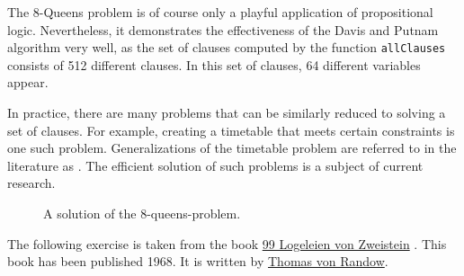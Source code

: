 The 8-Queens problem is of course only a playful application of propositional logic.
Nevertheless, it demonstrates the effectiveness of the Davis and Putnam algorithm very well, as the set of clauses computed by the function \texttt{allClauses}
consists of 512 different clauses. In this set of clauses, 64 different
variables appear.

In practice, there are many problems that can be similarly reduced to solving a
set of clauses. For example, creating a timetable that meets certain constraints is one such problem. Generalizations of the
timetable problem are referred to in the literature as .
The efficient solution of such problems is a subject of current research.

\begin{figure}[!ht]
  \centering
  \caption{A solution of the 8-queens-problem.}
  \label{fig:8-queens.pdf}
\end{figure}
\FloatBarrier
\vspace*{\fill}

\pagebreak

\exerciseEng
The following exercise is taken from the book 
\href{https://www.amazon.de/Logeleien-Zweistein-ihren-Antworten-Wegner/dp/B006YF0VUE}{99 Logeleien von
  Zweistein} \cite{randow:1968}.
This book has been published 1968.  It is written by 
\href{http://de.wikipedia.org/wiki/Thomas_von_Randow}{Thomas von Randow}.

